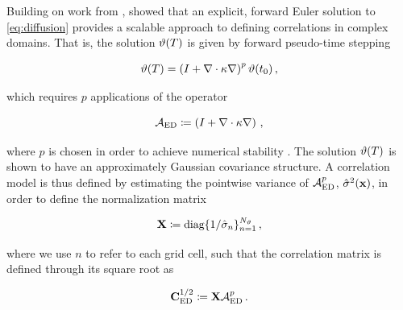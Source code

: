 Building on work from \citet{derber_global_1989, egbert_topexposeidon_1994,
bennett_generalized_1996},
\citet{weaver_correlation_2001} showed that an explicit, forward Euler solution to
\cref{eq:diffusion} provides a scalable approach to defining correlations in
complex domains.
That is, the solution $\vartheta(T)$ is given by forward pseudo-time stepping
\begin{linenomath*}\begin{equation}
    \vartheta(T) = \left( I + \nabla\cdot\kappa\nabla\right)^p \vartheta(t_0) \, ,
    \label{eq:wc01_diffusion}
\end{equation}\end{linenomath*}
which requires $p$ applications of the operator
\begin{linenomath*}\begin{equation*}
    \mathcal{A}_\text{ED} \coloneqq \left(I+\nabla\cdot\kappa\nabla\right) \, ,
\end{equation*}\end{linenomath*}
where $p$ is chosen in
order to achieve numerical stability \citep[see][for details regarding the
discretized form of this operator, and extensions of the model briefly shown
here]{weaver_correlation_2001}.
The solution $\vartheta(T)$ is shown to have an approximately Gaussian covariance
structure.
A correlation model is thus defined by estimating the pointwise
variance of $\mathcal{A}_\text{ED}^{p}$, $\hat{\sigma}^2(\mathbf{x})$, in order to define the normalization
matrix
\begin{linenomath*}\begin{equation*}
    \mathbf{X} \coloneqq \text{diag}\{1/\hat{\sigma}_n\}_{n=1}^{N_{\vartheta}} \, ,
\end{equation*}\end{linenomath*}
where we use $n$ to refer to each grid cell, such that the correlation matrix is
defined through its square root as
\begin{linenomath*}\begin{equation}
    \mathbf{C}^{1/2}_\text{ED} \coloneqq \mathbf{X} \mathcal{A}_\text{ED}^{p} \, .
\end{equation}\end{linenomath*}

